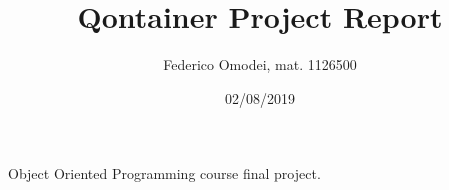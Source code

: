 
\title{\textbf{Qontainer Project Report}}
\author {Federico Omodei, mat. 1126500}
\date{02/08/2019}


\begin{titlepage}
\thispagestyle{empty}
\vfill
\maketitle

\begin{center}
\vfill
Object Oriented Programming course final project.\\
\vfill
\end{center}
\end{titlepage}

\pagebreak

\tableofcontents

\pagebreak



\pagebreak



\pagebreak



\pagebreak






